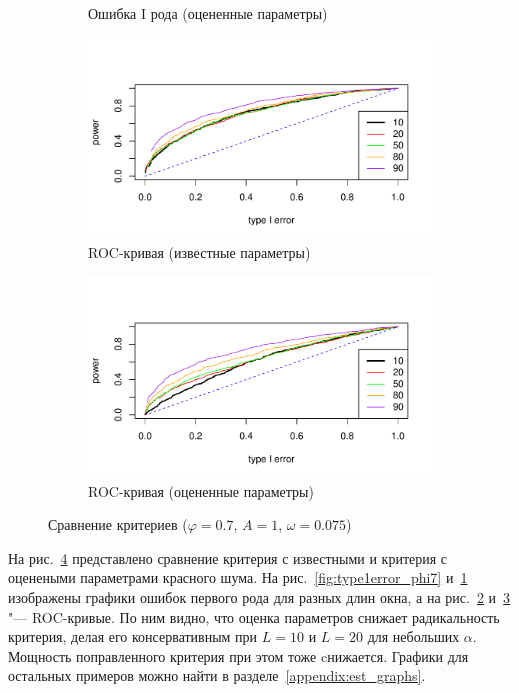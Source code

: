\documentclass[specialist,
substylefile = spbu_report.rtx,
subf,href,colorlinks=true, 12pt]{disser}
\theoremstyle{definition}
\begin{document}
\begin{figure}[h!]
\begin{subfigure}[t]{0.5\textwidth}
		\caption{Ошибка I рода (оцененные параметры)}
		\label{fig:type1error_phi7est}
	\end{subfigure}
	\bigskip
	\begin{subfigure}[t]{0.5\textwidth}
		\centering
		\includegraphics[width=\textwidth]{img/roc_phi7_omega0075.pdf}
		\caption{ROC-кривая (известные параметры)}
		\label{fig:roc_phi7_omega0075}
	\end{subfigure}\hspace{\fill}
	\begin{subfigure}[t]{0.5\textwidth}
		\centering
		\includegraphics[width=\textwidth]{img/roc_phi7est_omega0075.pdf}
		\caption{ROC-кривая (оцененные параметры)}
		\label{fig:roc_phi7est_omega0075}
	\end{subfigure}
	\caption{Сравнение критериев ($\varphi=0.7$, $A=1$, $\omega=0.075$)}
	\label{fig:est_comp}
\end{figure}

На рис.~\ref{fig:est_comp} представлено сравнение критерия с известными и критерия с оценеными параметрами красного шума. На рис.~\ref{fig:type1error_phi7} и~\ref{fig:type1error_phi7est} изображены графики ошибок первого рода для разных длин окна, а на рис.~\ref{fig:roc_phi7_omega0075} и~\ref{fig:roc_phi7est_omega0075} "--- ROC-кривые. По ним видно, что оценка параметров снижает радикальность критерия, делая его консервативным при $L=10$ и $L=20$ для небольших $\alpha$. Мощность поправленного критерия при этом тоже cнижается. Графики для остальных примеров можно найти в разделе~\ref{appendix:est_graphs}.
\end{document}

